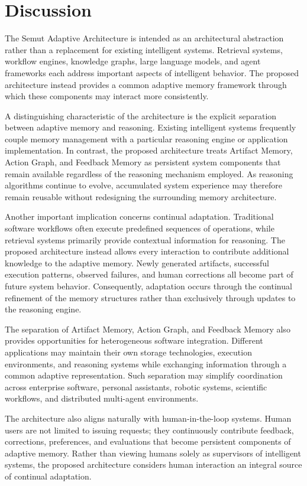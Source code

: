 \section{Discussion}
\label{sec:discussion}

The Semut Adaptive Architecture is intended as an architectural abstraction rather than a replacement for existing intelligent systems. Retrieval systems, workflow engines, knowledge graphs, large language models, and agent frameworks each address important aspects of intelligent behavior. The proposed architecture instead provides a common adaptive memory framework through which these components may interact more consistently.

A distinguishing characteristic of the architecture is the explicit separation between adaptive memory and reasoning. Existing intelligent systems frequently couple memory management with a particular reasoning engine or application implementation. In contrast, the proposed architecture treats Artifact Memory, Action Graph, and Feedback Memory as persistent system components that remain available regardless of the reasoning mechanism employed. As reasoning algorithms continue to evolve, accumulated system experience may therefore remain reusable without redesigning the surrounding memory architecture.

Another important implication concerns continual adaptation. Traditional software workflows often execute predefined sequences of operations, while retrieval systems primarily provide contextual information for reasoning. The proposed architecture instead allows every interaction to contribute additional knowledge to the adaptive memory. Newly generated artifacts, successful execution patterns, observed failures, and human corrections all become part of future system behavior. Consequently, adaptation occurs through the continual refinement of the memory structures rather than exclusively through updates to the reasoning engine.

The separation of Artifact Memory, Action Graph, and Feedback Memory also provides opportunities for heterogeneous software integration. Different applications may maintain their own storage technologies, execution environments, and reasoning systems while exchanging information through a common adaptive representation. Such separation may simplify coordination across enterprise software, personal assistants, robotic systems, scientific workflows, and distributed multi-agent environments.

The architecture also aligns naturally with human-in-the-loop systems. Human users are not limited to issuing requests; they continuously contribute feedback, corrections, preferences, and evaluations that become persistent components of adaptive memory. Rather than viewing humans solely as supervisors of intelligent systems, the proposed architecture considers human interaction an integral source of continual adaptation.

